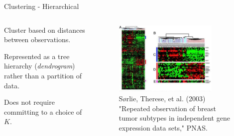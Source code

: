 \begin{frame}[allowframebreaks]{Clustering - Hierarchical}
\begin{columns}
    \begin{column}{0.45\textwidth}
        Cluster based on distances  between observations.

        \vspace{0.8em}

        Represented as a tree hierarchy  (\textit{dendrogram}) rather than a  partition of data.

        \vspace{0.8em}

        Does not require committing to a  choice of $K$.
    \end{column}
    \begin{column}{0.55\textwidth}
        \begin{figure}
            \centering
            \includegraphics[width=0.8\textwidth,keepaspectratio]{images/dul/hierarchical/breast-tumor-subtypes.jpg}
            \caption{Sørlie, Therese, et al. (2003) "Repeated observation of breast  tumor subtypes in independent gene expression data sets," PNAS.}
        \end{figure}
    \end{column}
\end{columns}
\end{frame}

